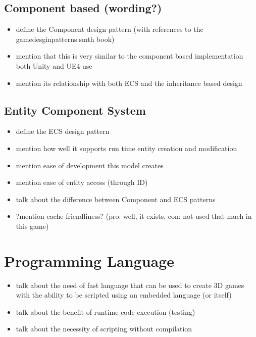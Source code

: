 \subsection{Component based (wording?)}

\begin{itemize}
    \item define the Component design pattern (with references to
         the gamedesginpatterns.smth book)
    \item mention that this is very similar to the component based implementation
         both Unity and UE4 use
    \item mention its relationship with both ECS and the inheritance based design
\end{itemize}

\subsection{Entity Component System}

\begin{itemize}
    \item define the ECS design pattern
    \item mention how well it supports run time entity creation and modification
    \item mention ease of development this model creates
    \item mention ease of entity access (through ID)
    \item talk about the difference between Component and ECS patterns
    \item ?mention cache friendliness? (pro: well, it exists, con: not used that
        much in this game)
\end{itemize}

\section{Programming Language}

\begin{itemize}
    \item talk about the need of fast language that can be used to create
        3D games with the ability to be scripted using an embedded language
        (or itself)
    \item talk about the benefit of runtime code execution (testing)
    \item talk about the necessity of scripting without compilation
\end{itemize}

